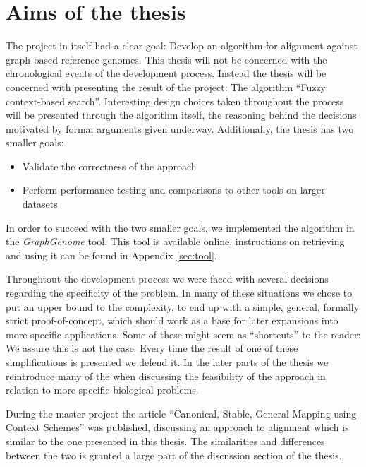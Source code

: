 \documentclass[thesis.tex]{subfiles}
\begin{document}
\section{Aims of the thesis}
The project in itself had a clear goal: Develop an algorithm for alignment against graph-based reference genomes. This thesis will not be concerned with the chronological events of the development process. Instead the thesis will be concerned with presenting the result of the project: The algorithm ``Fuzzy context-based search''. Interesting design choices taken throughout the process will be presented through the algorithm itself, the reasoning behind the decisions motivated by formal arguments given underway. Additionally, the thesis has two smaller goals:
\begin{itemize}
  \item Validate the correctness of the approach
  \item Perform performance testing and comparisons to other tools on larger datasets
\end{itemize}
In order to succeed with the two smaller goals, we implemented the algorithm in the \textit{GraphGenome} tool. This tool is available online, instructions on retrieving and using it can be found in Appendix \ref{sec:tool}.\\
\par\noindent
Throughtout the development process we were faced with several decisions regarding the specificity of the problem. In many of these situations we chose to put an upper bound to the complexity, to end up with a simple, general, formally strict proof-of-concept, which should work as a base for later expansions into more specific applications. Some of these might seem as ``shortcuts'' to the reader: We assure this is not the case. Every time the result of one of these simplifications is presented we defend it. In the later parts of the thesis we reintroduce many of the when discussing the feasibility of the approach in relation to more specific biological problems.\\
\par\noindent
During the master project the article ``Canonical, Stable, General Mapping using Context Schemes'' was published, discussing an approach to alignment which is similar to the one presented in this thesis. The similarities and differences between the two is granted a large part of the discussion section of the thesis.
\end{document}
